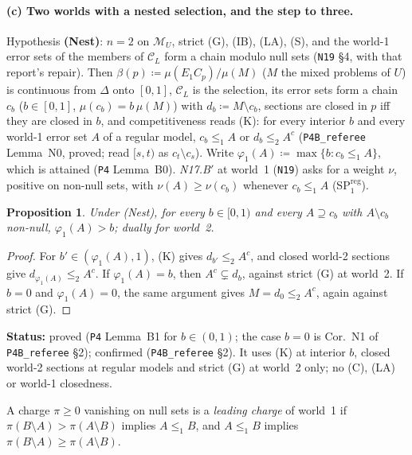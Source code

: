 \documentclass[11pt]{article}
\newtheorem{proposition}[theorem]{Proposition}
\theoremstyle{definition}
\theoremstyle{remark}
\newcommand{\M}{\mathcal M}
\newcommand{\C}{\mathcal C}
\newcommand{\src}[1]{\texttt{#1}}
\newcommand{\status}[1]{\par\smallskip\noindent\textbf{Status:} #1\par\smallskip}
\begin{document}
\paragraph{(c) Two worlds with a nested selection, and the step to three.} Hypothesis \textbf{(Nest)}: $n=2$ on $\M_U$, strict (G), (IB), (LA), (S), and the world-1 error sets of the members of $\C_L$ form a chain modulo null sets (\src{N19} \S4, with that report's repair). Then $\beta(p)\coloneqq\mu(E_1C_p)/\mu(M)$ ($M$ the mixed problems of $U$) is continuous from $\Delta$ onto $[0,1]$, $\C_L$ is the selection, its error sets form a chain $c_b$ ($b\in[0,1]$, $\mu(c_b)=b\,\mu(M)$) with $d_b\coloneqq M\setminus c_b$, sections are closed in $p$ iff they are closed in $b$, and competitiveness reads (K): for every interior $b$ and every world-1 error set $A$ of a regular model, $c_b\le_1A$ or $d_b\le_2A^c$ (\src{P4B\_referee} Lemma~N0, proved; read $[s,t)$ as $c_t\setminus c_s$). Write $\varphi_1(A)\coloneqq\max\{b:c_b\le_1A\}$, which is attained (\src{P4} Lemma~B0). \emph{N17.B$'$} at world~1 (\src{N19}) asks for a weight $\nu$, positive on non-null sets, with $\nu(A)\ge\nu(c_b)$ whenever $c_b\le_1A$ (SP$^{\mathrm{reg}}_1$).

\begin{proposition}\label{prop:strictescape}
Under (Nest), for every $b\in[0,1)$ and every $A\supseteq c_b$ with $A\setminus c_b$ non-null, $\varphi_1(A)>b$; dually for world~2.
\end{proposition}
\begin{proof}
For $b'\in(\varphi_1(A),1)$, (K) gives $d_{b'}\le_2A^c$, and closed world-2 sections give $d_{\varphi_1(A)}\le_2A^c$. If $\varphi_1(A)=b$, then $A^c\subsetneq d_b$, against strict (G) at world~2. If $b=0$ and $\varphi_1(A)=0$, the same argument gives $M=d_0\le_2A^c$, again against strict (G).
\end{proof}
\status{proved (\src{P4} Lemma~B1 for $b\in(0,1)$; the case $b=0$ is Cor.~N1 of \src{P4B\_referee} \S2); confirmed (\src{P4B\_referee} \S2). It uses (K) at interior $b$, closed world-2 sections at regular models and strict (G) at world~2 only; no (C), (LA) or world-1 closedness.}

A charge $\pi\ge0$ vanishing on null sets is a \emph{leading charge} of world~1 if $\pi(B\setminus A)>\pi(A\setminus B)$ implies $A\le_1B$, and $A\le_1B$ implies $\pi(B\setminus A)\ge\pi(A\setminus B)$.
\end{document}
